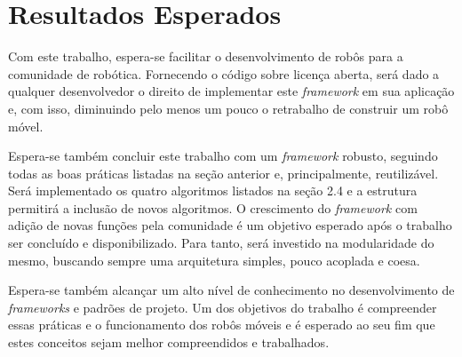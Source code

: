 \chapter[Resultados Esperados]{Resultados Esperados}

Com este trabalho, espera-se facilitar o desenvolvimento de robôs para a comunidade de robótica. Fornecendo o código sobre licença aberta, será dado a qualquer desenvolvedor o direito de implementar este \textit{framework} em sua aplicação e, com isso, diminuindo pelo menos um pouco o retrabalho de construir um robô móvel.

Espera-se também concluir este trabalho com um \textit{framework} robusto, seguindo todas as boas práticas listadas na seção anterior e, principalmente, reutilizável. Será implementado os quatro algoritmos listados na seção 2.4 e a estrutura permitirá a inclusão de novos algoritmos. O crescimento do \textit{framework} com adição de novas funções pela comunidade é um objetivo esperado após o trabalho ser concluído e disponibilizado. Para tanto, será investido na modularidade do mesmo, buscando sempre uma arquitetura simples, pouco acoplada e coesa.

Espera-se também alcançar um alto nível de conhecimento no desenvolvimento de \textit{frameworks} e padrões de projeto. Um dos objetivos do trabalho é compreender essas práticas e o funcionamento dos robôs móveis e é esperado ao seu fim que estes conceitos sejam melhor compreendidos e trabalhados.